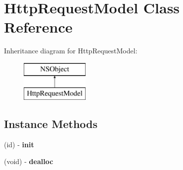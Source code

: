 \hypertarget{interface_http_request_model}{}\section{Http\+Request\+Model Class Reference}
\label{interface_http_request_model}
Inheritance diagram for Http\+Request\+Model\+:\begin{figure}[H]
\begin{center}
\leavevmode
\includegraphics[height=2.000000cm]{interface_http_request_model}
\end{center}
\end{figure}
\subsection*{Instance Methods}
\begin{DoxyCompactItemize}
\item 
\mbox{\label{interface_http_request_model_a467c64d1c09b7a114cf88878cadf2dc9}} 
(id) -\/ {\bfseries init}
\item 
\mbox{\label{interface_http_request_model_aedbaf1e4759d2bd4f835ce28e5ae84f3}} 
(void) -\/ {\bfseries dealloc}
\end{DoxyCompactItemize}
